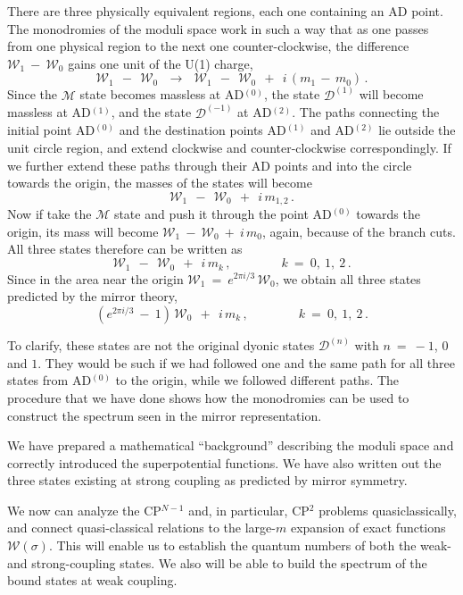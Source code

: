 \documentclass[epsfig,12pt]{article}
\def\beq{\begin{equation}}
\def\eeq{\end{equation}}
\def\beq{\begin{equation}}
\def\eeq{\end{equation}}
\newcommand{\W}{\mathcal{W}}
\newcommand{\M}{\mathcal{M}}
\newcommand{\D}{\mathcal{D}}
\begin{document}
	There are three physically equivalent regions, each one containing an AD point.
	The monodromies of the moduli space work in such a way that as one passes from 
	one physical region to the next one counter-clockwise, the difference 
$ \W_1 ~-~ \W_0 $
	gains one unit of the U(1) charge,
\beq
	\W_1 ~~-~~ \W_0  ~~~\to~~~ \W_1 ~~-~~ \W_0 ~~+~~ i\,( m_1 \,-\, m_0 ) \,.
\eeq
	Since the $ \M $ state becomes massless at AD$^{(0)}$, the state $ \D^{(1)} $ will become
	massless at AD$^{(1)}$, and the state $ \D^{(-1)} $ at AD$^{(2)}$.
	The paths connecting the initial point AD$^{(0)}$ and the destination points AD$^{(1)}$ and AD$^{(2)}$
	lie outside the unit circle region, and 
	extend clockwise and counter-clockwise correspondingly.
	If we further extend these paths through their AD points and into the circle towards the origin,
	the masses of the states will become
\beq
	\W_1 ~~-~~ \W_0 ~~+~~ i\, m_{1,2}\,.
\eeq
	Now if take the $ \M $ state and push it through the point AD$^{(0)}$ towards the origin,
	its mass will become $ \W_1 ~-~ \W_0 ~+~ i\,m_0 $, again, because of the branch cuts.
	All three states therefore can be written as
\beq
	\W_1 ~~-~~ \W_0 ~~+~~ i\, m_k\,,\qquad\qquad k~=~ 0,~1,~2\,.
\eeq
	Since in the area near the origin $ \W_1 ~=~ e^{2 \pi i / 3}\, \W_0 $, we obtain all three states 
	predicted by the mirror theory,
\beq
	(e^{2 \pi i /3} ~-~ 1)\, \W_0 ~~+~~ i\, m_k\,,\qquad\qquad k~=~ 0,~1,~2\,.
\eeq

	To clarify, these states are not the original dyonic states $ \D^{(n)} $ with $ n ~=~ -1 $,
	$ 0 $ and $ 1 $.
	They would be such if we had followed one and the same path for all three states from AD$^{(0)}$ to
	the origin, while we followed different paths.
	The procedure that we have done shows how the monodromies can be used to construct the spectrum
	seen in the mirror representation.

	We have prepared a mathematical ``background'' describing the moduli space and 
	correctly introduced the superpotential functions.
	We have also written out the three states existing at strong coupling as predicted by mirror symmetry.
	
	We now can analyze the CP$^{N-1}$ and, in particular, CP$^2$ problems quasiclassically, and 
	connect quasi-classical relations to the large-$ m $ expansion of exact functions $ \W(\sigma) $.
	This will enable us to establish the quantum numbers of both the weak- and strong-coupling states.
	We also will be able to build the spectrum of the bound states at weak coupling.
\end{document}

